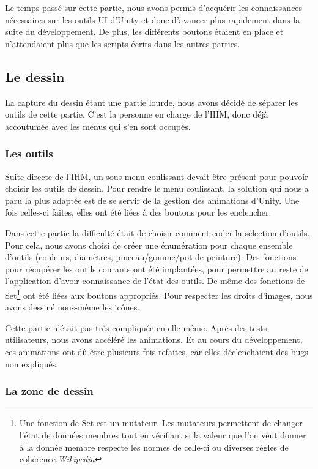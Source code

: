 \documentclass[a4paper,11pt]{article}
\begin{document}
			Le temps passé sur cette partie, nous avons permis d'acquérir les connaissances nécessaires sur les outils UI d'Unity et donc d'avancer plus rapidement dans la suite du développement. De plus, les différents boutons étaient en place et n'attendaient plus que les scripts écrits dans les autres parties.
		
		\subsection{Le dessin}
			La capture du dessin étant une partie lourde, nous avons décidé de séparer les outils de cette partie. C'est la personne en charge de l'IHM, donc déjà accoutumée avec les menus qui s'en sont occupés.
		
		
			\subsubsection{Les outils}				
				Suite directe de l'IHM, un sous-menu coulissant devait être présent pour pouvoir choisir les outils de dessin. Pour rendre le menu coulissant, la solution qui nous a paru la plus adaptée est de se servir de la gestion des animations d'Unity. Une fois celles-ci faites, elles ont été liées à des boutons pour les enclencher.
					
				Dans cette partie la difficulté était de choisir comment coder la sélection d'outils. Pour cela, nous avons choisi de créer une énumération pour chaque ensemble d'outils (couleurs, diamètres, pinceau/gomme/pot de peinture). Des fonctions pour récupérer les outils courants ont été implantées, pour permettre au reste de l'application d'avoir connaissance de l'état des outils. De même des fonctions de Set\footnote{Une fonction de Set est un mutateur. Les mutateurs permettent de changer l'état de données membres tout en vérifiant si la valeur que l'on veut donner à la donnée membre respecte les normes de celle-ci ou diverses règles de cohérence.\emph{Wikipedia}} ont été liées aux boutons appropriés. Pour respecter les droits d'images, nous avons dessiné nous-même les icônes.
				
				Cette partie n'était pas très compliquée en elle-même. Après des tests utilisateurs, nous avons accéléré les animations. Et au cours du développement, ces animations ont dû être plusieurs fois refaites, car elles déclenchaient des bugs non expliqués.
			\subsubsection{La zone de dessin}
			
\end{document}
